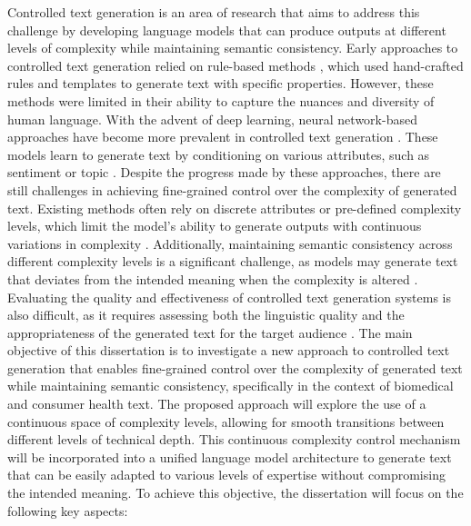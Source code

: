 Controlled text generation is an area of research that aims to address this challenge by developing language models that can produce outputs at different levels of complexity while maintaining semantic consistency. Early approaches to controlled text generation relied on rule-based methods \cite{kukich1983design}, which used hand-crafted rules and templates to generate text with specific properties. However, these methods were limited in their ability to capture the nuances and diversity of human language. With the advent of deep learning, neural network-based approaches have become more prevalent in controlled text generation \cite{gatt2018survey}. These models learn to generate text by conditioning on various attributes, such as sentiment or topic \cite{hu2017toward, keskar2019ctrl}.
Despite the progress made by these approaches, there are still challenges in achieving fine-grained control over the complexity of generated text. Existing methods often rely on discrete attributes or pre-defined complexity levels, which limit the model's ability to generate outputs with continuous variations in complexity \cite{zhang2022survey}. Additionally, maintaining semantic consistency across different complexity levels is a significant challenge, as models may generate text that deviates from the intended meaning when the complexity is altered \cite{liu2022controlling}. Evaluating the quality and effectiveness of controlled text generation systems is also difficult, as it requires assessing both the linguistic quality and the appropriateness of the generated text for the target audience \cite{liu2022controlling}.
The main objective of this dissertation is to investigate a new approach to controlled text generation that enables fine-grained control over the complexity of generated text while maintaining semantic consistency, specifically in the context of biomedical and consumer health text.
The proposed approach will explore the use of a continuous space of complexity levels, allowing for smooth transitions between different levels of technical depth. This continuous complexity control mechanism will be incorporated into a unified language model architecture to generate text that can be easily adapted to various levels of expertise without compromising the intended meaning.
To achieve this objective, the dissertation will focus on the following key aspects:

